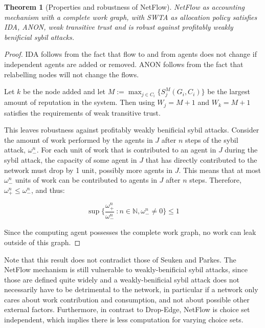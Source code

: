 \documentclass[a4paper,11pt]{book}
\newcommand{\bb}{\mathbb}
\newtheorem{theorem}{Theorem}
\theoremstyle{definition}
\begin{document}
\begin{theorem}[Properties and robustness of NetFlow]
    NetFlow as accounting mechanism with a complete work graph, with SWTA as allocation policy
    satisfies IDA, ANON, weak transitive trust and is robust against
    profitably weakly benificial sybil attacks.

    \label{thm:prop-rob-NetFlow}
\end{theorem}


\begin{proof}
    IDA follows from the fact that flow to and from agents does not change if independent agents
    are added or removed. ANON follows from the fact that relabelling nodes will not change the flows.

    Let $k$ be the node added and let 
    $M := \max_{j \in C_i}\{S^M_j(G_i, C_i)\}$ be the largest amount of reputation in the system.
    Then using $W_j = M+1$ and $W_k = M+1$ satisfies the requirements of weak transitive trust.

    This leaves robustness against profitably weakly benificial sybil attacks. Consider the amount of
    work performed by the agents in $J$ after $n$ steps of the sybil attack,  $\omega^n_-$. For each
    unit of work that is contributed to an agent in $J$ during the sybil attack, the capacity
    of some agent in $J$ that has directly contributed to the network must drop by 1 unit, possibly more
    agents in $J$. This means that at most $\omega^n_-$ units of work can be contributed to agents
    in $J$ after $n$ steps. Therefore, $\omega^n_+ \leq \omega^n_-$, and thus:

    \begin{equation*}
        \sup \{\frac{\omega^n_+}{\omega^n_-}\ : n \in \bb{N}, \omega^n_- \neq 0\} \leq 1
    \end{equation*}

    Since the computing agent possesses the complete work graph, no work can leak outside of this graph.
\end{proof}

Note that this result does not contradict those of Seuken and Parkes. The NetFlow mechanism is
still vulnerable to weakly-benificial sybil attacks, since those are defined quite widely and
a weakly-benificial sybil attack does not necessarily have to be detrimental to the network,
in particular if a network only cares about work contribution and consumption, and
not about possible other external factors. Furthermore, in contrast to Drop-Edge, NetFlow
is choice set independent, which implies there is less computation for varying choice sets.
\end{document}
